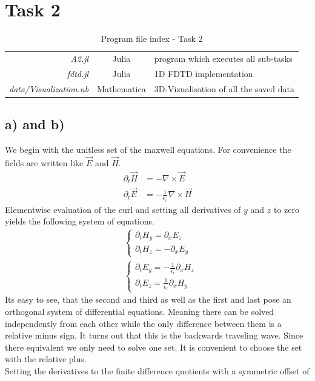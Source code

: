 \documentclass[12pt,a4paper]{article}
\begin{document}
\section*{Task 2}
	\begin{table}[H]
		\caption{Program file index - Task 2}
		\begin{tabular}{r|c|l}
			\textit{A2.jl} & Julia & program which executes all sub-tasks \\
			\textit{fdtd.jl} & Julia & 1D FDTD implementation \\
			\textit{data/Visualization.nb} & Mathematica & 3D-Vizualisation of all the saved data
		\end{tabular}
	\end{table}
	\subsection*{a) and b)}
		We begin with the unitless set of the maxwell equations. For convenience the fields are written like \(\vec{E}\)
		and \(\vec{H}\).
		\begin{align}
			\partial_t\vec{H}&=-\nabla\times\vec{E} \\
			\partial_t\vec{E}&=-\frac{1}{\epsilon_r}\nabla\times\vec{H}
		\end{align}
		Elementwise evaluation of the curl and setting all derivatives of \(y\) and \(z\) to zero yields
		the following system of equations.
		\begin{align}
			&\begin{cases}
				\partial_t H_y=\partial_x E_z \\
				\partial_t H_z=-\partial_x E_y
			\end{cases}\\
			&\begin{cases}
				\partial_t E_y=-\frac{1}{\epsilon_r}\partial_x H_z \\
				\partial_t E_z=\frac{1}{\epsilon_r}\partial_x H_y
			\end{cases}
		\end{align}
		Its easy to see, that the second and third as well as the first and last pose an orthogonal
		system of differential equations. Meaning there can be solved independently from each other
		while the only difference between them is a relative minus sign. It turns out that this is
		the backwards traveling wave. Since there equivalent we only need to solve one set. It is
		convenient to choose the set with the relative plus.\\
		Setting the derivatives to the finite difference quotients with a symmetric offset of
\end{document}
